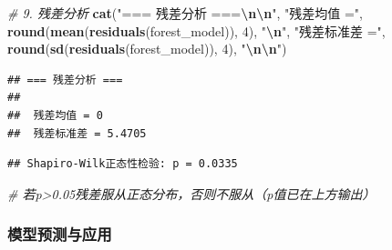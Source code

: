 \documentclass[
  twoside,12pt,fontset=none]{ctexbook}
\newenvironment{Shaded}{\begin{snugshade}}{\end{snugshade}}
\newcommand{\CommentTok}[1]{\textcolor[rgb]{0.56,0.35,0.01}{\textit{#1}}}
\newcommand{\DecValTok}[1]{\textcolor[rgb]{0.00,0.00,0.81}{#1}}
\newcommand{\FunctionTok}[1]{\textcolor[rgb]{0.13,0.29,0.53}{\textbf{#1}}}
\newcommand{\NormalTok}[1]{#1}
\newcommand{\OtherTok}[1]{\textcolor[rgb]{0.56,0.35,0.01}{#1}}
\newcommand{\SpecialCharTok}[1]{\textcolor[rgb]{0.81,0.36,0.00}{\textbf{#1}}}
\newcommand{\StringTok}[1]{\textcolor[rgb]{0.31,0.60,0.02}{#1}}
\begin{document}
\begin{Shaded}
\begin{Highlighting}[]
\CommentTok{\# 9. 残差分析}
\FunctionTok{cat}\NormalTok{(}\StringTok{"=== 残差分析 ===}\SpecialCharTok{\textbackslash{}n\textbackslash{}n}\StringTok{"}\NormalTok{,}
    \StringTok{"残差均值 ="}\NormalTok{, }\FunctionTok{round}\NormalTok{(}\FunctionTok{mean}\NormalTok{(}\FunctionTok{residuals}\NormalTok{(forest\_model)), }\DecValTok{4}\NormalTok{), }\StringTok{"}\SpecialCharTok{\textbackslash{}n}\StringTok{"}\NormalTok{,}
    \StringTok{"残差标准差 ="}\NormalTok{, }\FunctionTok{round}\NormalTok{(}\FunctionTok{sd}\NormalTok{(}\FunctionTok{residuals}\NormalTok{(forest\_model)), }\DecValTok{4}\NormalTok{), }\StringTok{"}\SpecialCharTok{\textbackslash{}n\textbackslash{}n}\StringTok{"}\NormalTok{)}
\end{Highlighting}
\end{Shaded}

\begin{verbatim}
## === 残差分析 ===
## 
##  残差均值 = 0 
##  残差标准差 = 5.4705
\end{verbatim}

\begin{Shaded}
\end{Shaded}

\begin{verbatim}
## Shapiro-Wilk正态性检验: p = 0.0335
\end{verbatim}

\begin{Shaded}
\begin{Highlighting}[]
\CommentTok{\# 若p\textgreater{}0.05残差服从正态分布，否则不服从（p值已在上方输出）}
\end{Highlighting}
\end{Shaded}

\hypertarget{ux6a21ux578bux9884ux6d4bux4e0eux5e94ux7528}{%
\subsubsection{模型预测与应用}\label{ux6a21ux578bux9884ux6d4bux4e0eux5e94ux7528}}
\end{document}
